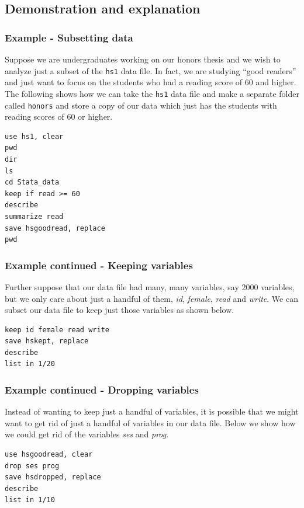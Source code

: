 \documentclass{article}
\begin{document}
\subsection{Demonstration and explanation}

\subsubsection{Example - Subsetting data}

Suppose we are undergraduates working on our honors thesis and we wish to analyze just a subset of the \lstinline{hs1} data file.  In fact, we are studying ``good readers'' and just want to focus on the students who had a reading score of 60 and higher.  The following shows how we can take the \lstinline{hs1} data file and make a separate folder called \lstinline{honors} and store a copy of our data which just has the students with reading scores of 60 or higher.

\begin{lstlisting}
use hs1, clear
pwd
dir
ls
cd Stata_data
keep if read >= 60
describe
summarize read
save hsgoodread, replace
pwd
\end{lstlisting}

\subsubsection{Example continued - Keeping variables}

Further suppose that our data file had many, many variables, say 2000 variables, but we only care about just a handful of them, \textit{id}, \textit{female}, \textit{read} and \textit{write}.  We can subset our data file to keep just those variables as shown below.

\begin{lstlisting}
keep id female read write
save hskept, replace
describe
list in 1/20
\end{lstlisting}

\subsubsection{Example continued - Dropping variables}

Instead of wanting to keep just a handful of variables, it is possible that we might want to get rid of just a handful of variables in our data file.  Below we show how we could get rid of the variables \textit{ses} and \textit{prog}.

\begin{lstlisting}
use hsgoodread, clear
drop ses prog
save hsdropped, replace
describe
list in 1/10
\end{lstlisting}
\end{document}
